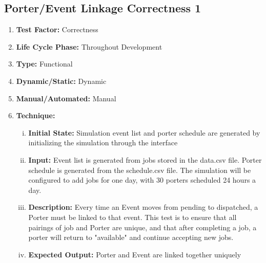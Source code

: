 \documentclass[paper=letter, fontsize=10pt]{scrartcl}
\numberwithin{equation}{section}		%
\numberwithin{figure}{section}			%
\numberwithin{table}{section}				%
\begin{document}
\subsection{Porter/Event Linkage Correctness 1}
\begin{enumerate}[] 	
	\item \textbf{Test Factor:} Correctness 
	\item \textbf{Life Cycle Phase:} Throughout Development
	\item \textbf{Type:} Functional
	\item \textbf{Dynamic/Static:} Dynamic
	\item \textbf{Manual/Automated:} Manual
	\item \textbf{Technique:}
		\begin{enumerate}[(i)]
			\item \textbf{Initial State:} Simulation event list and porter schedule are generated by initializing the simulation through the interface
			\item \textbf{Input:} Event list is generated from jobs stored in the data.csv file. Porter schedule is generated from the schedule.csv file. The simulation will be configured to add jobs for one day, with 30 porters scheduled 24 hours a day.
			\item \textbf{Description:} Every time an Event moves from pending to dispatched, a Porter must be linked to that event. This test is to ensure that all pairings of job and Porter are unique, and that after completing a job, a porter will return to "available" and continue accepting new jobs.
			\item \textbf{Expected Output:} Porter and Event are linked together uniquely 
		\end{enumerate}
\end{enumerate}
\end{document}
